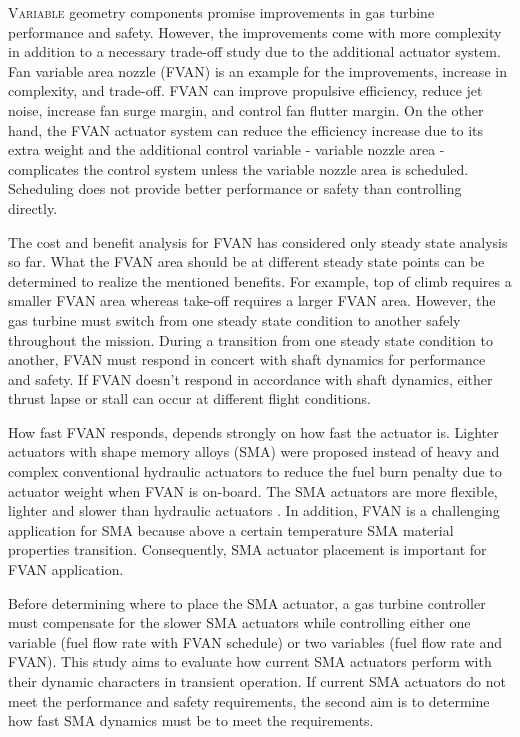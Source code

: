 \lettrine[nindent=0pt]{V}{ariable} geometry components promise improvements in gas turbine performance and safety. However, the improvements come with more complexity in addition to a necessary trade-off study due to the additional actuator system. Fan variable area nozzle (FVAN) is an example for the improvements, increase in complexity, and trade-off. FVAN can improve propulsive efficiency, reduce jet noise, increase fan surge margin, and control fan flutter margin. On the other hand, the FVAN actuator system can reduce the efficiency increase due to its extra weight and the additional control variable - variable nozzle area - complicates the control system unless the variable nozzle area is scheduled. Scheduling does not provide better performance or safety than controlling directly. 

The cost and benefit analysis for FVAN has considered only steady state analysis so far. What the FVAN area should be at different steady state points can be determined to realize the mentioned benefits. For example, top of climb requires a smaller FVAN area whereas take-off requires a larger FVAN area. However, the gas turbine must switch from one steady state condition to another safely throughout the mission. During a transition from one steady state condition to another, FVAN must respond in concert with shaft dynamics for performance and safety. If FVAN doesn't respond in accordance with shaft dynamics, either thrust lapse or stall can occur at different flight conditions. 

How fast FVAN responds, depends strongly on how fast the actuator is. Lighter actuators with shape memory alloys (SMA) \cite{Mabe:2008,Mabe:2008:Paris} were proposed instead of heavy and complex conventional hydraulic actuators to reduce the fuel burn penalty due to actuator weight when FVAN is on-board. The SMA actuators are more flexible, lighter and slower than hydraulic actuators \cite{Rey:2001,Barooah:2002,Song:2007}. In addition, FVAN is a challenging application for SMA because above a certain temperature SMA material properties transition. Consequently, SMA actuator placement is important for FVAN application.  

Before determining where to place the SMA actuator, a gas turbine controller must compensate for the slower SMA actuators while controlling either one variable (fuel flow rate with FVAN schedule) or two variables (fuel flow rate and FVAN). This study aims to evaluate how current SMA actuators perform with their dynamic characters in transient operation. If current SMA actuators do not meet the performance and safety requirements, the second aim is to determine how fast SMA dynamics must be to meet the requirements.

